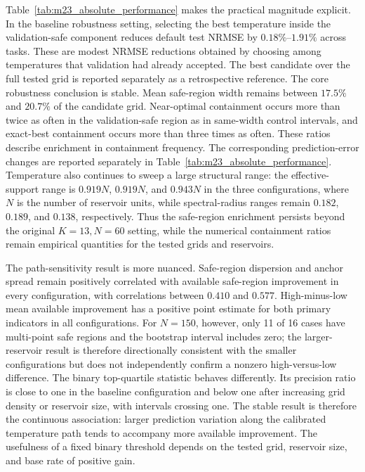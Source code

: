\documentclass[11pt,a4paper]{article}
\begin{document}
Table~\ref{tab:m23_absolute_performance} makes the practical magnitude explicit. In the baseline robustness setting, selecting the best temperature inside the validation-safe component reduces default test NRMSE by $0.18\%$--$1.91\%$ across tasks. These are modest NRMSE reductions obtained by choosing among temperatures that validation had already accepted. The best candidate over the full tested grid is reported separately as a retrospective reference. The core robustness conclusion is stable. Mean safe-region width remains between $17.5\%$ and $20.7\%$ of the candidate grid. Near-optimal containment occurs more than twice as often in the validation-safe region as in same-width control intervals, and exact-best containment occurs more than three times as often. These ratios describe enrichment in containment frequency. The corresponding prediction-error changes are reported separately in Table~\ref{tab:m23_absolute_performance}. Temperature also continues to sweep a large structural range: the effective-support range is $0.919N$, $0.919N$, and $0.943N$ in the three configurations, where $N$ is the number of reservoir units, while spectral-radius ranges remain $0.182$, $0.189$, and $0.138$, respectively. Thus the safe-region enrichment persists beyond the original $K=13,N=60$ setting, while the numerical containment ratios remain empirical quantities for the tested grids and reservoirs.

The path-sensitivity result is more nuanced. Safe-region dispersion and anchor spread remain positively correlated with available safe-region improvement in every configuration, with correlations between $0.410$ and $0.577$. High-minus-low mean available improvement has a positive point estimate for both primary indicators in all configurations. For $N=150$, however, only 11 of 16 cases have multi-point safe regions and the bootstrap interval includes zero; the larger-reservoir result is therefore directionally consistent with the smaller configurations but does not independently confirm a nonzero high-versus-low difference. The binary top-quartile statistic behaves differently. Its precision ratio is close to one in the baseline configuration and below one after increasing grid density or reservoir size, with intervals crossing one. The stable result is therefore the continuous association: larger prediction variation along the calibrated temperature path tends to accompany more available improvement. The usefulness of a fixed binary threshold depends on the tested grid, reservoir size, and base rate of positive gain.
\end{document}
